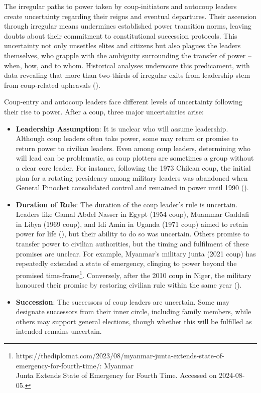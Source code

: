 \documentclass[
  12pt,
]{report}
\begin{document}
The irregular paths to power taken by coup-initiators and autocoup
leaders create uncertainty regarding their reigns and eventual
departures. Their ascension through irregular means undermines
established power transition norms, leaving doubts about their
commitment to constitutional succession protocols. This uncertainty not
only unsettles elites and citizens but also plagues the leaders
themselves, who grapple with the ambiguity surrounding the transfer of
power -- when, how, and to whom. Historical analyses underscore this
predicament, with data revealing that more than two-thirds of irregular
exits from leadership stem from coup-related upheavals
().

Coup-entry and autocoup leaders face different levels of uncertainty
following their rise to power. After a coup, three major uncertainties
arise:

\begin{itemize}
\item
  \textbf{Leadership Assumption}: It is unclear who will assume
  leadership. Although coup leaders often take power, some may return or
  promise to return power to civilian leaders. Even among coup leaders,
  determining who will lead can be problematic, as coup plotters are
  sometimes a group without a clear core leader. For instance, following
  the 1973 Chilean coup, the initial plan for a rotating presidency
  among military leaders was abandoned when General Pinochet
  consolidated control and remained in power until 1990
  ().
\item
  \textbf{Duration of Rule}: The duration of the coup leader's rule is
  uncertain. Leaders like Gamal Abdel Nasser in Egypt (1954 coup),
  Muammar Gaddafi in Libya (1969 coup), and Idi Amin in Uganda (1971
  coup) aimed to retain power for life
  (), but
  their ability to do so was uncertain. Others promise to transfer power
  to civilian authorities, but the timing and fulfilment of these
  promises are unclear. For example, Myanmar's military junta (2021
  coup) has repeatedly extended a state of emergency, clinging to power
  beyond the promised time-frame\footnote{https://thediplomat.com/2023/08/myanmar-junta-extends-state-of-emergency-for-fourth-time/:
    Myanmar\\
    Junta Extends State of Emergency for Fourth Time. Accessed on
    2024-08-05.}. Conversely, after the 2010 coup in Niger, the military
  honoured their promise by restoring civilian rule within the same year
  ().
\item
  \textbf{Succession}: The successors of coup leaders are uncertain.
  Some may designate successors from their inner circle, including
  family members, while others may support general elections, though
  whether this will be fulfilled as intended remains uncertain.
\end{itemize}
\end{document}
